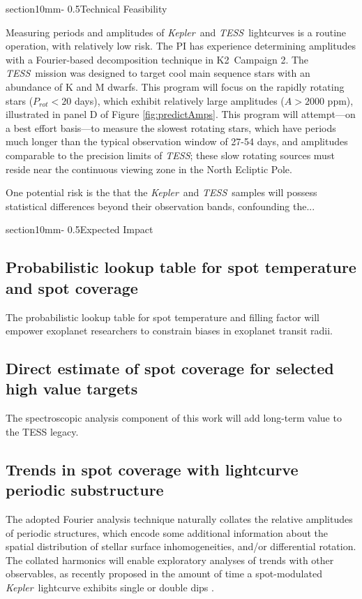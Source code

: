 \documentclass[letterpaper,11pt]{article}
\makeatletter
\renewcommand{\section}{\@startsection%
{section}{1}{0mm}{-\baselineskip}%
{0.5\baselineskip}{\normalfont\Large\bfseries}}%
\newcommand{\tess}{{\it TESS}}
\newcommand{\kepler}{{\it Kepler}}
\newcommand{\ktwo}{{K2}}
\makeatother
\begin{document}
\section{Technical Feasibility}

Measuring periods and amplitudes of \kepler\ and \tess\ lightcurves is a routine operation, with relatively low risk.  The PI has experience determining amplitudes with a Fourier-based decomposition technique in \ktwo\ Campaign 2.  The \tess\ mission was designed to target cool main sequence stars with an abundance of K and M dwarfs.  This program will focus on the rapidly rotating stars ($P_{rot}<20$ days), which exhibit relatively large amplitudes ($A>2000$ ppm), illustrated in panel D of Figure \ref{fig:predictAmps}.  This program will attempt---on a best effort basis---to measure the slowest rotating stars, which have periods much longer than the typical observation window of 27-54 days, and amplitudes comparable to the precision limits of \tess; these slow rotating sources must reside near the continuous viewing zone in the North Ecliptic Pole.

One potential risk is the that the \kepler\ and \tess\ samples will possess statistical differences beyond their observation bands, confounding the...

\section{Expected Impact}

\subsection{Probabilistic lookup table for spot temperature and spot coverage}
The probabilistic lookup table for spot temperature and filling factor will empower exoplanet researchers to constrain biases in exoplanet transit radii.

\subsection{Direct estimate of spot coverage for selected high value targets}
The spectroscopic analysis component of this work will add long-term value to the TESS legacy.

\subsection{Trends in spot coverage with lightcurve periodic substructure}
The adopted Fourier analysis technique naturally collates the relative amplitudes of periodic structures, which encode some additional information about the spatial distribution of stellar surface inhomogeneities, and/or differential rotation.  The collated harmonics will enable exploratory analyses of trends with other observables, as recently proposed in the amount of time a spot-modulated \kepler\ lightcurve exhibits single or double dips \citep{2018ApJ...863..190B}.
\end{document}
